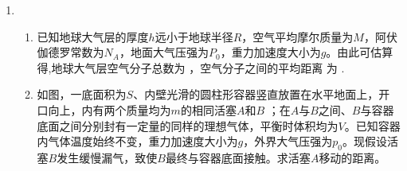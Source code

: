 \begin{enumerate}[leftmargin=0em]
\begin{enumerate}
{\begin{enumerate}
\end{enumerate}


}




\end{enumerate}



\newpage
\item 
{}
\begin{enumerate}
\renewcommand{\labelenumi}{\arabic{enumi}.}
\item
已知地球大气层的厚度$ h $远小于地球半径$ R $，空气平均摩尔质量为$ M $，阿伏伽德罗常数为$ N_{A} $，地面大气压强为$ P_{0} $，重力加速度大小为$ g $。由此可估算得,地球大气层空气分子总数为  ，空气分子之间的平均距离
为  .
 
\item 
如图，一底面积为$ S $、内壁光滑的圆柱形容器竖直放置在水平地面上，开口向上，内有两个质量均为$ m $的相同活塞$ A $和$ B $ ；在$ A $与$ B $之间、$ B $与容器底面之间分别封有一定量的同样的理想气体，平衡时体积均为$ V $。已知容器内气体温度始终不变，重力加速度大小为$ g $，外界大气压强为$ p_{0} $。现假设活塞$ B $发生缓慢漏气，致使$ B $最终与容器底面接触。求活塞$ A $移动的距离。
\begin{figure}[h!]
\flushright

\end{figure}





\end{enumerate}







\end{enumerate}	





